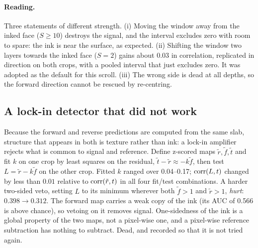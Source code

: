 \paragraph{Reading.} Three statements of different strength. (i) Moving the window away from the inked face ($S\ge10$) destroys the signal, and the interval excludes zero with room to spare: the ink is near the surface, as expected. (ii) Shifting the window two layers towards the inked face ($S=2$) gains about $0.03$ in correlation, replicated in direction on both crops, with a pooled interval that just excludes zero. It was adopted as the default for this scroll. (iii) The wrong side is dead at all depths, so the forward direction cannot be rescued by re-centring.

\subsection{A lock-in detector that did not work}
Because the forward and reverse predictions are computed from the same slab, structure that appears in both is texture rather than ink: a lock-in amplifier rejects what is common to signal and reference. Define z-scored maps $\tilde r,\tilde f,\tilde t$ and fit $k$ on one crop by least squares on the residual, $\tilde t-\tilde r\approx -k\tilde f$, then test $L=\tilde r-k\tilde f$ on the other crop. Fitted $k$ ranged over \numrange{0.04}{0.17}; $\operatorname{corr}(L,t)$ changed by less than $0.01$ relative to $\operatorname{corr}(\tilde r,t)$ in all four fit/test combinations. A harder two-sided veto, setting $L$ to its minimum wherever both $\tilde f>1$ and $\tilde r>1$, \emph{hurt}: $0.398\to0.312$. The forward map carries a weak copy of the ink (its AUC of 0.566 is above chance), so vetoing on it removes signal. One-sidedness of the ink is a global property of the two maps, not a pixel-wise one, and a pixel-wise reference subtraction has nothing to subtract. Dead, and recorded so that it is not tried again.
